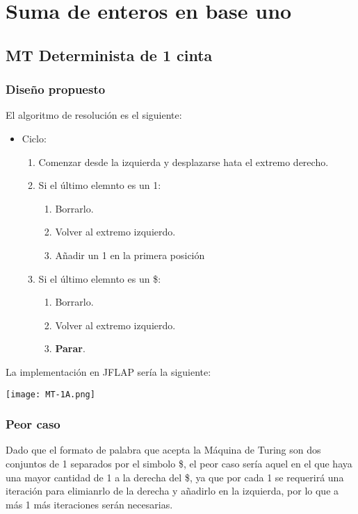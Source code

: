 \section{Suma de enteros en base uno}

\subsection{MT Determinista de 1 cinta}

\subsubsection*{Diseño propuesto}
El algoritmo de resolución es el siguiente:

\begin{itemize}
    \item Ciclo:
    \begin{enumerate}[1.]
        \item Comenzar desde la izquierda y desplazarse hata el extremo derecho.
        \item Si el último elemnto es un 1:
        \begin{enumerate}[1.]
            \item Borrarlo.
            \item Volver al extremo izquierdo.
            \item Añadir un 1 en la primera posición
        \end{enumerate}
        \item Si el último elemnto es un \$:
        \begin{enumerate}[1.]
            \item Borrarlo.
            \item Volver al extremo izquierdo.
            \item \textbf{Parar}.
        \end{enumerate}
    \end{enumerate}
\end{itemize}

La implementación en JFLAP sería la siguiente:

\texttt{[image: MT-1A.png]}


\subsubsection*{Peor caso}
Dado que el formato de palabra que acepta la Máquina de Turing son dos conjuntos de 1 separados por el simbolo \$, el peor caso sería aquel en el que haya una mayor cantidad de 1 a la derecha del \$, ya que por cada 1 se requerirá una iteración para elimianrlo de la derecha y añadirlo en la izquierda, por lo que a más 1 más iteraciones serán necesarias.

